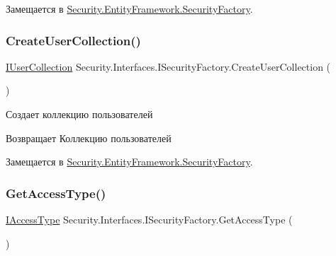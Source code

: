Замещается в \hyperlink{class_security_1_1_entity_framework_1_1_security_factory_a7d14f76fcb34ef137f2d4f425585d5ee}{Security.\+Entity\+Framework.\+Security\+Factory}.

\mbox{\label{interface_security_1_1_interfaces_1_1_i_security_factory_af7bc3e5089a1611eea69ea5c4c8735c9}} 
\subsubsection{\texorpdfstring{Create\+User\+Collection()}{CreateUserCollection()}}
{\footnotesize\ttfamily \hyperlink{interface_security_1_1_interfaces_1_1_collections_1_1_i_user_collection}{I\+User\+Collection} Security.\+Interfaces.\+I\+Security\+Factory.\+Create\+User\+Collection (\begin{DoxyParamCaption}{ }\end{DoxyParamCaption})}



Создает коллекцию пользователей 

\begin{DoxyReturn}{Возвращает}
Коллекцию пользователей
\end{DoxyReturn}


Замещается в \hyperlink{class_security_1_1_entity_framework_1_1_security_factory_a9b16e937fcec0adc84622f5823d83a30}{Security.\+Entity\+Framework.\+Security\+Factory}.

\mbox{\label{interface_security_1_1_interfaces_1_1_i_security_factory_a0e9cedfa313829d1f3d74b5c439ad285}} 
\subsubsection{\texorpdfstring{Get\+Access\+Type()}{GetAccessType()}}
{\footnotesize\ttfamily \hyperlink{interface_security_1_1_interfaces_1_1_model_1_1_i_access_type}{I\+Access\+Type} Security.\+Interfaces.\+I\+Security\+Factory.\+Get\+Access\+Type (\begin{DoxyParamCaption}{ }\end{DoxyParamCaption})}



